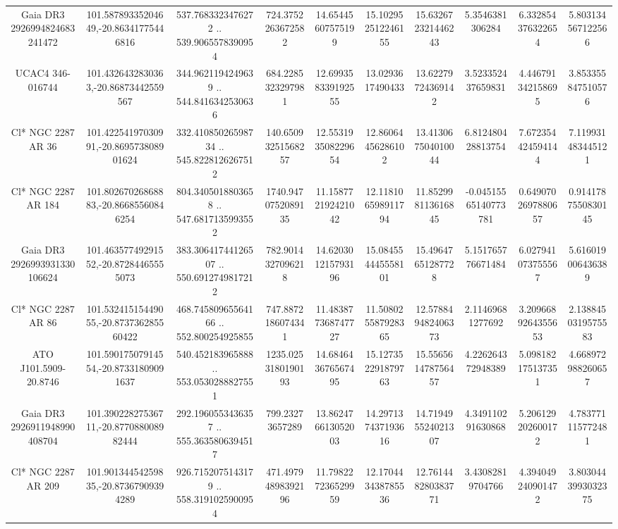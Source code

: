 \begin{table}
\begin{tabular}{cccccccccc}
Gaia DR3 2926994824683241472 & 101.58789335204649,-20.86341775446816 & 537.7683323476272 .. 539.9065578390954 & 724.3752263672582 & 14.65445607575199 & 15.102952512246155 & 15.632672321446243 & 5.3546381306284 & 6.332854376322654 & 5.803134567122566 \\
UCAC4 346-016744 & 101.4326432830363,-20.86873442559567 & 344.9621194249639 .. 544.8416342530636 & 684.2285323297981 & 12.699358339192555 & 13.0293617490433 & 13.62279724369142 & 3.523352437659831 & 4.446791342158695 & 3.853355847510576 \\
Cl* NGC 2287     AR      36 & 101.42254197030991,-20.869573808901624 & 332.41085026598734 .. 545.8228126267512 & 140.65093251568257 & 12.553193508229654 & 12.86064456286102 & 13.413067504010044 & 6.812480428813754 & 7.672354424594144 & 7.119931483445121 \\
Cl* NGC 2287     AR     184 & 101.80267026868883,-20.86685560846254 & 804.3405018803658 .. 547.6817135993552 & 1740.9470752089135 & 11.158772192421042 & 12.118106598911794 & 11.852998113616845 & -0.04515565140773781 & 0.6490702697880657 & 0.9141787550830145 \\
Gaia DR3 2926993931330106624 & 101.46357749291552,-20.87284465555073 & 383.30641744126507 .. 550.6912749817212 & 782.9014327096218 & 14.620301215793196 & 15.084554445558101 & 15.49647651287728 & 5.151765776671484 & 6.027941073755567 & 5.616019006436389 \\
Cl* NGC 2287     AR      86 & 101.53241515449055,-20.873736285560422 & 468.74580965564166 .. 552.800254925855 & 747.8872186074341 & 11.483877368747727 & 11.508025587928365 & 12.578849482406373 & 2.11469681277692 & 3.2096689264355653 & 2.1388450319575583 \\
ATO J101.5909-20.8746 & 101.59017507914554,-20.87331809091637 & 540.452183965888 .. 553.0530288827551 & 1235.0253180190193 & 14.684643676567495 & 15.127352291879763 & 15.556561478756457 & 4.226264372948389 & 5.098182175137351 & 4.668972988260657 \\
Gaia DR3 2926911948990408704 & 101.39022827536711,-20.877088008982444 & 292.1960553436357 .. 555.3635806394517 & 799.23273657289 & 13.862476613052003 & 14.297137437193616 & 14.719495524021307 & 4.349110291630868 & 5.206129202600172 & 4.783771115772481 \\
Cl* NGC 2287     AR     209 & 101.90134454259835,-20.87367909394289 & 926.7152075143179 .. 558.3191025900954 & 471.49794898392196 & 11.798227236529959 & 12.170443438785536 & 12.761448280383771 & 3.43082819704766 & 4.394049240901472 & 3.8030443993032375 \\

\end{tabular}
\end{table}
